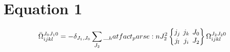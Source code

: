 \documentclass{scrartcl}
\newcommand{\sixj}[6]{\begingroup\setlength{\arraycolsep}{0.2em}\begin{Bmatrix} #1 & #2 & #3 \\ #4 & #5 & #6 \end{Bmatrix}\endgroup}
\begin{document}
\section{Equation 1}
\begin{dmath*}
\bar{\Omega}_{i j k l}^{{J}_{0} {J}_{1} 0} = -\delta_{{J}_{1},{J}_{0}} \* \sum_{{J}_{2}} \* \hatfact{{J}_{2}^{2}} \* \sixj{{j}_{j}}{{j}_{k}}{{J}_{0}}{{j}_{l}}{{j}_{i}}{{J}_{2}} \* \Omega_{i j k l}^{{J}_{2} {J}_{2} 0}
\end{dmath*}
\end{document}
